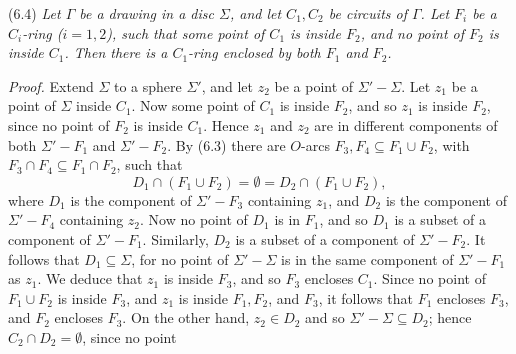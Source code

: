 \stmt
(6.4) \textit{Let $\Gamma$ be a drawing in a disc $\Sigma$, and let $C_1, C_2$ be circuits of $\Gamma$. Let $F_i$ be a $C_i$-ring ($i = 1, 2$), such that some point of $C_1$ is inside $F_2$, and no point of $F_2$ is inside $C_1$. Then there is a $C_1$-ring enclosed by both $F_1$ and $F_2$.}

\textit{Proof.} Extend $\Sigma$ to a sphere $\Sigma'$, and let $z_2$ be a point of $\Sigma' - \Sigma$. Let $z_1$ be a point of $\Sigma$ inside $C_1$. Now some point of $C_1$ is inside $F_2$, and so $z_1$ is inside $F_2$, since no point of $F_2$ is inside $C_1$. Hence $z_1$ and $z_2$ are in different components of both $\Sigma' - F_1$ and $\Sigma' - F_2$. By (6.3) there are $O$-arcs $F_3, F_4 \subseteq F_1 \cup F_2$, with $F_3 \cap F_4 \subseteq F_1 \cap F_2$, such that
\begin{equation*}
D_1 \cap (F_1 \cup F_2) = \emptyset = D_2 \cap (F_1 \cup F_2),
\end{equation*}
where $D_1$ is the component of $\Sigma' - F_3$ containing $z_1$, and $D_2$ is the component of $\Sigma' - F_4$ containing $z_2$. Now no point of $D_1$ is in $F_1$, and so $D_1$ is a subset of a component of $\Sigma' - F_1$. Similarly, $D_2$ is a subset of a component of $\Sigma' - F_2$. It follows that $D_1 \subseteq \Sigma$, for no point of $\Sigma' - \Sigma$ is in the same component of $\Sigma' - F_1$ as $z_1$. We deduce that $z_1$ is inside $F_3$, and so $F_3$ encloses $C_1$. Since no point of $F_1 \cup F_2$ is inside $F_3$, and $z_1$ is inside $F_1, F_2$, and $F_3$, it follows that $F_1$ encloses $F_3$, and $F_2$ encloses $F_3$. On the other hand, $z_2 \in D_2$ and so $\Sigma' - \Sigma \subseteq D_2$; hence $C_2 \cap D_2 = \emptyset$, since no point

